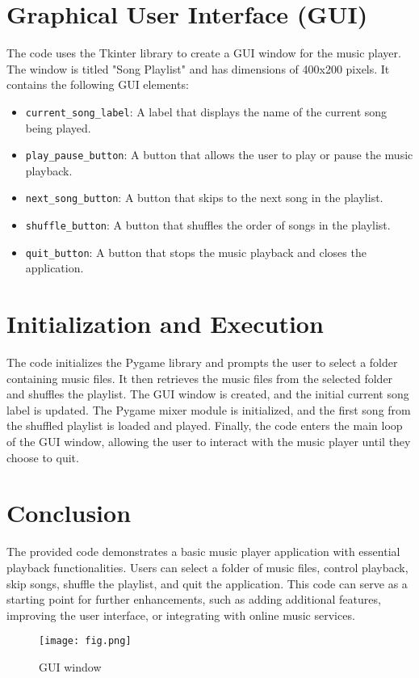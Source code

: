 \documentclass{article}
\begin{document}
\section{Graphical User Interface (GUI)}
The code uses the Tkinter library to create a GUI window for the music player. The window is titled "Song Playlist" and has dimensions of 400x200 pixels. It contains the following GUI elements:

\begin{itemize}
  \item \texttt{current\_song\_label}: A label that displays the name of the current song being played.

  \item \texttt{play\_pause\_button}: A button that allows the user to play or pause the music playback.

  \item \texttt{next\_song\_button}: A button that skips to the next song in the playlist.

  \item \texttt{shuffle\_button}: A button that shuffles the order of songs in the playlist.

  \item \texttt{quit\_button}: A button that stops the music playback and closes the application.
\end{itemize}

\section{Initialization and Execution}
The code initializes the Pygame library and prompts the user to select a folder containing music files. It then retrieves the music files from the selected folder and shuffles the playlist. The GUI window is created, and the initial current song label is updated. The Pygame mixer module is initialized, and the first song from the shuffled playlist is loaded and played. Finally, the code enters the main loop of the GUI window, allowing the user to interact with the music player until they choose to quit.

\section{Conclusion}
The provided code demonstrates a basic music player application with essential playback functionalities. Users can select a folder of music files, control playback, skip songs, shuffle the playlist, and quit the application. This code can serve as a starting point for further enhancements, such as adding additional features, improving the user interface, or integrating with online music services.

\begin{figure}
    \centering
    \texttt{[image: fig.png]}
    \caption{GUI window}
    \label{fig:my_label}
\end{figure}
\end{document}
